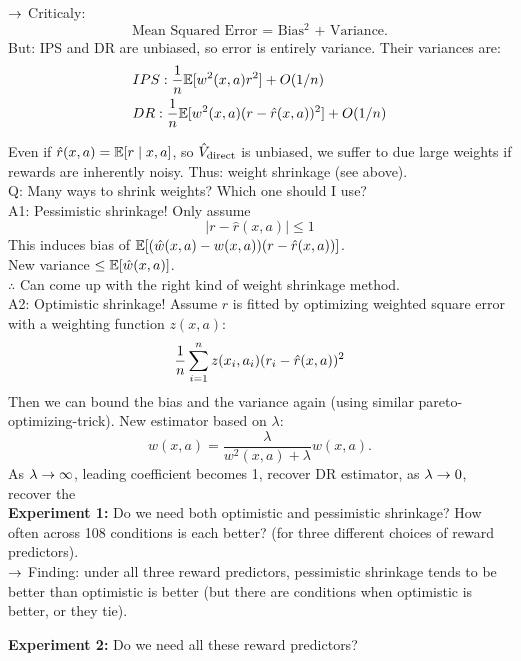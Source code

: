 $\rightarrow$ Criticaly:
\[
\text{Mean Squared Error = Bias$^2$ + Variance.}
\]
But: IPS and DR are unbiased, so error is entirely variance. Their variances are:
\begin{align}
    &IPS: \frac{1}{n}\mathbb{E}[w^2(x,a)r^2] + O(1/n) \\
    &DR: \frac{1}{n}\mathbb{E}[w^2(x,a)(r - \hat{r}(x,a))^2] + O(1/n) \\
\end{align}

Even if $\hat{r}(x,a) = \mathbb{E}[r \mid x,a]$, so $\hat{V}_{\text{direct}}$ is unbiased, we suffer to due large weights if rewards are inherently noisy. Thus: weight shrinkage (see above). \\

Q: Many ways to shrink weights? Which one should I use? \\

A1: Pessimistic shrinkage! Only assume
\[
|r - \hat{r}(x,a)| \leq 1
\]
This induces bias of $\mathbb{E}[(\hat{w}(x,a) - w(x,a))(r-\hat{r}(x,a))]$. \\

New variance $\leq \mathbb{E}[\hat{w}(x,a)]$. \\

$\therefore$ Can come up with the right kind of weight shrinkage method. \\

A2: Optimistic shrinkage! Assume $\hat{r}$ is fitted by optimizing weighted square error with a weighting function $z(x,a)$:
\[
\frac{1}{n} \sum_{i = 1}^n z(x_i, a_i) (r_i - \hat{r}(x,a))^2
\]
Then we can bound the bias and the variance again (using similar pareto-optimizing-trick). New estimator based on $\lambda$:
\[
\hat{w}(x,a) = \frac{\lambda}{w^2(x,a) + \lambda} w(x,a).
\]
As $\lambda \rightarrow \infty$, leading coefficient becomes 1, recover DR estimator, as $\lambda \rightarrow 0$, recover the  \\

{\bf Experiment 1:} Do we need both optimistic and pessimistic shrinkage? How often across 108 conditions is each better? (for three different choices of reward predictors). \\

$\rightarrow$ Finding: under all three reward predictors, pessimistic shrinkage tends to be better than optimistic is better (but there are conditions when optimistic is better, or they tie).

{\bf Experiment 2:} Do we need all these reward predictors? \\

